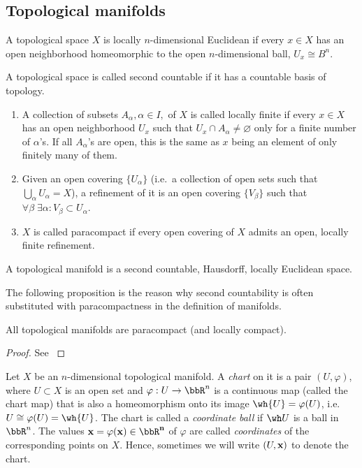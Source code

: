 \subsection{Topological manifolds}
\begin{defn}
A topological space $X$ is locally $n$-dimensional Euclidean if every $x\in X$ has an open neighborhood homeomorphic to the open $n$-dimensional ball, $U_x\cong B^n$. 
\end{defn}
\begin{defn}
A topological space is called second countable if it has a countable basis of topology.
\end{defn}
\begin{defn}[Paracompactness]
\begin{enumerate}
    \item A collection of subsets $A_\alpha, \alpha \in I,$ of $X$ is called locally finite if every $x\in X$ has an open neighborhood $U_x$ such that $U_x\cap A_\alpha \neq \varnothing$ only for a finite number of $\alpha$'s. If all $A_\alpha$'s are open, this is the same as $x$ being an element of only finitely many of them.
    \item Given an open covering $\{U_\alpha\}$ (i.e.\ a collection of open sets such that $\bigcup_\alpha U_\alpha=X$), a refinement of it is an open covering $\{V_\beta \}$ such that $\forall \beta \;\exists \alpha: V_\beta \subset U_\alpha $.
    \item $X$ is called paracompact if every open covering of $X$ admits an open, locally finite refinement.
\end{enumerate}
\end{defn}
\begin{defn}
A topological manifold is a second countable, Hausdorff, locally Euclidean space.
\end{defn}
The following proposition is the reason why second countability is often substituted with paracompactness in the definition of manifolds.
\begin{prop}
All topological manifolds are paracompact (and locally compact).
\end{prop}
\begin{proof}
See \cite[Thm. 1.15]{Lee}
\end{proof}
\begin{defn}[Charts]
Let $X$ be an $n$-dimensional topological manifold. A \emph{chart} on it is a pair $(U,\varphi)$, where $U\subset X$ is an open set and $\varphi:U\to \bbR^n$ is a continuous map (called the chart map) that is also a homeomorphism onto its image $\wh{U}=\varphi (U)$, i.e.\ $U\cong \varphi(U)=\wh{U}$. The chart is called a \emph{coordinate ball} if $\wh U$ is a ball in $\bbR^n$. The values $\bf{x}=\varphi(x)\in\bbR^n$ of $\varphi$ are called \emph{coordinates} of the corresponding points on $X$. Hence, sometimes we will write $(U,\bf{x})$ to denote the chart.
\end{defn}
